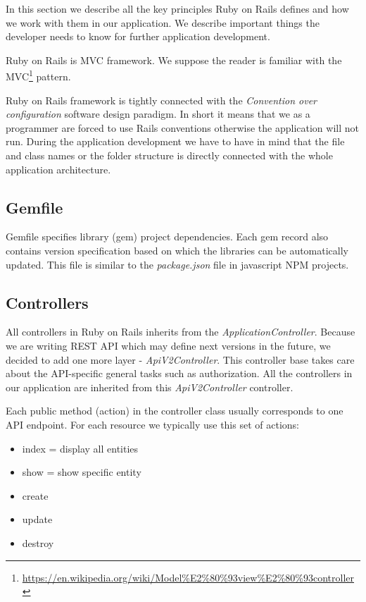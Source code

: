 	In this section we describe all the key principles Ruby on Rails defines and how we work with them in our application. We describe important things the developer needs to know for further application development. 

	Ruby on Rails is MVC framework. We suppose the reader is familiar with the MVC\footnote{\url{https://en.wikipedia.org/wiki/Model\%E2\%80\%93view\%E2\%80\%93controller}} pattern.
	
	Ruby on Rails framework is tightly connected with the \textit{Convention over configuration} software design paradigm. In short it means that we as a programmer are forced to use Rails conventions otherwise the application will not run. During the application development we have to have in mind that the file and class names or the folder structure is directly connected with the whole application architecture.
	
	\subsection{Gemfile}
		Gemfile specifies library (gem) project dependencies. Each gem record also contains version specification based on which the libraries can be automatically updated. This file is similar to the \textit{package.json} file in javascript NPM projects.
	
	
	\subsection{Controllers}
		 All controllers in Ruby on Rails inherits from the \textit{ApplicationController}. Because we are writing REST API which may define next versions in the future, we decided to add one more layer - \textit{ApiV2Controller}. This controller base takes care about the API-specific general tasks such as authorization. All the controllers in our application are inherited from this \textit{ApiV2Controller} controller.
		
		Each public method (action) in the controller class usually corresponds to one API endpoint. For each resource we typically use this set of actions:
		\begin{itemize}
			\item index = display all entities
			\item show = show specific entity
			\item create
			\item update
			\item destroy		
		\end{itemize} 
	
